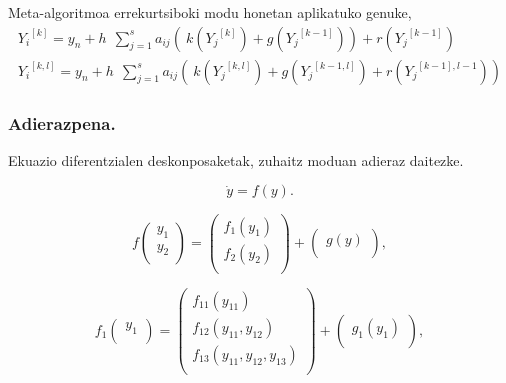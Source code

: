 Meta-algoritmoa errekurtsiboki modu honetan aplikatuko genuke,
\begin{align*}
{{Y_i}^{[k]}=y_n+h\ \ \sum^s_{j=1}{a_{ij}(\ k({Y_j}^{[k]})+g({Y_j}^{[k-1]}))+r({Y_j}^{[k-1]}) }}\\
{{Y_i}^{[k,l]}=y_n+h\ \ \sum^s_{j=1}{a_{ij}(\ k({Y_j}^{[k,l]})+g({Y_j}^{[k-1,l]})+r({Y_j}^{[k-1],l-1})) }}
\end{align*}

\subsubsection*{Adierazpena.}

Ekuazio diferentzialen deskonposaketak, zuhaitz moduan adieraz daitezke.

\begin{equation*}
\dot{y}=f(y).
\end{equation*}


\begin{equation*}
f\left ( \begin{array}{c}
   y_1 \\
   y_2 \\
\end{array} \right)=
\left ( \begin{array}{c}
   f_1(y_1) \\
   f_2(y_2) \\
\end{array} \right)+
\left ( \begin{array}{c}
   g(y) \\
\end{array} \right),
\end{equation*}


\begin{equation*}
f_1\left ( \begin{array}{c}
   y_1 \\
\end{array} \right)=
\left ( \begin{array}{c}
   f_{11}(y_{11}) \\
   f_{12}(y_{11},y_{12}) \\
   f_{13}(y_{11},y_{12},y_{13}) \\
\end{array} \right)+
\left ( \begin{array}{c}
   g_1(y_1) \\
\end{array} \right),
\end{equation*}


